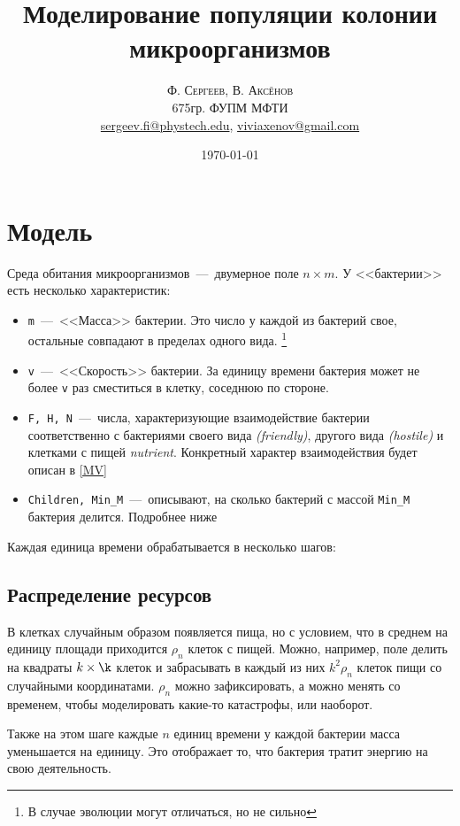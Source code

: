 \documentclass[11pt,twoside,twocolumn,russian,a4paper]{article}
\title{Моделирование популяции колонии микроорганизмов} %
\author{
	\textsc{Ф. Сергеев, В. Аксёнов} \\[0.5ex] %
	\normalsize 675гр. ФУПМ МФТИ \\ %
	\normalsize \href{mailto:sergeev.fi@phystech.edu}{sergeev.fi@phystech.edu}, \href{mailto:viviaxenov@gmail.com}{viviaxenov@gmail.com}	\normalsize 
}
\date{\today} %
\begin{document}
\maketitle


\section{Модель}

\noindent Среда обитания микроорганизмов~---~двумерное поле $n\times m$. %
У <<бактерии>> есть несколько характеристик:
\begin{itemize}
	\item \texttt{m}~---~<<Масса>> бактерии. Это число у каждой из бактерий свое, остальные совпадают в пределах одного вида. \footnote{%
																В случае эволюции могут отличаться, но не сильно}
	\item \texttt{v}~---~<<Скорость>> бактерии. За единицу времени бактерия может не более \texttt{v} раз сместиться в клетку, соседнюю по стороне.
	\item \texttt{F, H, N}~---~числа, характеризующие взаимодействие бактерии соответственно с бактериями 
		своего вида \textit{(friendly)}, 
		другого вида \textit{(hostile)} 
		и клетками с пищей \textit{nutrient}. Конкретный характер взаимодействия будет описан в \ref{MV}
	\item \texttt{Children, Min\_M}~---~описывают, на сколько бактерий с массой \texttt{Min\_M} бактерия делится. Подробнее ниже %
\end{itemize}
Каждая единица времени обрабатывается в несколько шагов:
\subsection{Распределение ресурсов}
	В клетках случайным образом появляется пища, но с условием, что в среднем на единицу площади приходится $\rho_n$ клеток с пищей. 
	Можно, например, поле делить на квадраты $k\times\k$ клеток и забрасывать в каждый из них $k^2\rho_n$ клеток пищи со случайными координатами. $\rho_n$ 
	можно зафиксировать, а можно  менять со временем, чтобы моделировать какие-то катастрофы, или наоборот. 

	Также на этом шаге каждые $n$ единиц времени у каждой бактерии масса уменьшается на единицу. Это отображает то, что бактерия тратит энергию на свою деятельность.
\end{document}
